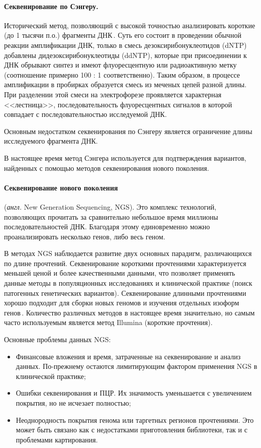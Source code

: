 \documentclass[a4paper,14pt]{extarticle}
\newcommand{\anglia}[1]{\textit{англ.} \textenglish{#1}}
\begin{document}
\paragraph{Секвенирование по Сэнгеру.}
Исторический метод, позволяющий с высокой точностью анализировать короткие (до 1 тысячи п.о.) фрагменты ДНК\,\cite{Sanger_1977}.
Суть его состоит в проведении обычной реакции амплификации ДНК, только в смесь дезоксирибонуклеотидов (dNTP) добавлены дидезоксирибонуклеотиды (ddNTP), которые при присоединении к ДНК обрывают синтез и имеют флуоресцентную или радиоактивную метку (соотношение примерно 100 : 1 соответственно).
Таким образом, в процессе амплификации в пробирках образуется смесь из меченых цепей разной длины.
При разделении этой смеси на электрофорезе проявляется характерная <<лестница>>, последовательность флуоресцентных сигналов в которой совпадает с последовательностью исследуемой ДНК.

Основным недостатком секвенирования по Сэнгеру является ограничение длины исследуемого фрагмента ДНК.

В настоящее время метод Сэнгера используется для подтверждения вариантов, найденных с помощью методов секвенирования нового поколения.

\paragraph{Секвенирование нового поколения} (\anglia{New Generation Sequencing, NGS}).
Это комплекс технологий, позволяющих прочитать за сравнительно небольшое время миллионы последовательностей ДНК.
Благодаря этому единовременно можно проанализировать несколько генов, либо весь геном.

В методах NGS наблюдается развитие двух основных парадигм, различающихся по длине прочтений.
Секвенирование короткими прочтениями характеризуется меньшей ценой и более качественными данными, что позволяет применять данные методы в популяционных исследованиях и клинической практике (поиск патогенных генетических вариантов).
Секвенирование длинными прочтениями хорошо подходит для сборки новых геномов и изучения отдельных изоформ генов\,\cite{Goodwin_2016}.
Количество различных методов в настоящее время значительно, но самым часто используемым является метод Illumina (короткие прочтения).

Основные проблемы данных NGS:

\begin{itemize}
\item Финансовые вложения и время, затраченные на секвенирование и анализ данных.
По-прежнему остаются лимитирующим фактором применения NGS в клинической практике;
\item Ошибки секвенирования и ПЦР.
Их значимость уменьшается с увеличением покрытия, но не исчезает полностью;
\item Неоднородность покрытия генома или таргетных регионов прочтениями.
Это может быть связано как с недостатками приготовления библиотеки, так и с проблемами картирования.
\end{itemize}
\end{document}
